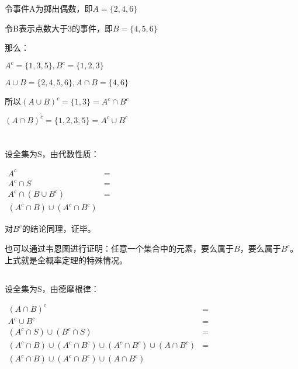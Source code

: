 \documentclass[UTF8]{article}
\begin{document}
    \section{}
        令事件A为掷出偶数，即$A = \{2, 4, 6\}$
        
        令B表示点数大于3的事件，即$B = \{4, 5, 6\}$

        那么：

        $A^c = \{1, 3, 5\}, B^c = \{1, 2, 3\}$

        $A \cup B = \{2, 4, 5, 6\}, A \cap B = \{4, 6\}$

        所以$(A \cup B)^c = \{1, 3\} = A^c \cap B^c$
        
        $(A \cap B)^c = \{1, 2, 3, 5\} = A^c \cup B^c$
    \section{}
        \subsection{}
            设全集为S，由代数性质：
            
            $\begin{array}{lcr}
                A^c & = \\
            A^c \cap S & = \\
            A^c \cap (B \cup B^c) & = \\
            (A^c \cap B) \cup (A^c \cap B^c)
            \end{array}$

            对$B^c$的结论同理，证毕。

            也可以通过韦恩图进行证明：任意一个集合中的元素，要么属于$B$，要么属于$B^c$。上式就是全概率定理的特殊情况。
        \subsection{}
            设全集为S，由德摩根律：

            $\begin{array}{lcr}
                (A \cap B)^c & = \\
                A^c \cup B^c & = \\
                (A^c \cap S) \cup (B^c \cap S) & = \\
                (A^c \cap B) \cup  (A^c \cap B^c) \cup (A^c \cap B^c) \cup (A \cap B^c) & = \\
                (A^c \cap B) \cup  (A^c \cap B^c) \cup (A \cap B^c)
            \end{array}$
\end{document}
